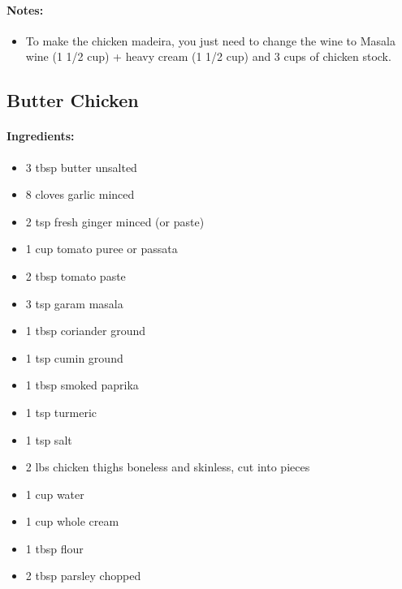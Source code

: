 \documentclass{article}
\begin{document}
\paragraph{Notes:}
\begin{itemize}
    \item To make the chicken madeira, you just need to change the wine to Masala wine (1 1/2 cup) + heavy cream (1 1/2 cup) and 3 cups of chicken stock.
\end{itemize}

\subsection{Butter Chicken}

\paragraph{Ingredients:}
\begin{itemize}
    \item 3 tbsp butter unsalted
    \item 8 cloves garlic minced
    \item 2 tsp fresh ginger minced (or paste)
    \item 1 cup tomato puree or passata
    \item 2 tbsp tomato paste
    \item 3 tsp garam masala
    \item 1 tbsp coriander ground
    \item 1 tsp cumin ground
    \item 1 tbsp smoked paprika
    \item 1 tsp turmeric
    \item 1 tsp salt
    \item 2 lbs chicken thighs boneless and skinless, cut into pieces
    \item 1 cup water
    \item 1 cup whole cream
    \item 1 tbsp flour
    \item 2 tbsp parsley chopped
\end{itemize}
\end{document}
